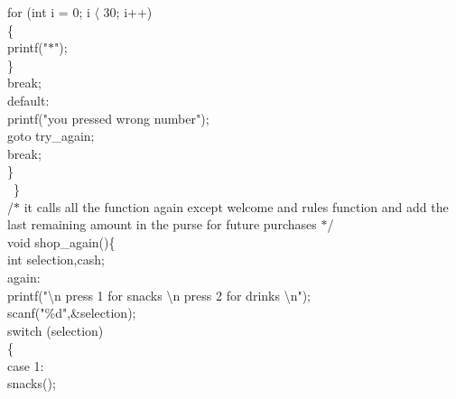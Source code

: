 \documentclass[10pt,a4paper]{article}
\begin{document}
\begin{flushleft}
    \hspace*{0.5cm}  for (int i = 0; i $\langle$ 30; i++)\\
    \hspace*{0.5cm}  \{\\
    \hspace*{0.5cm}  \hspace*{0.5cm}printf("$\ast$");\\
    \hspace*{0.5cm}  \}\\
    \hspace*{0.5cm}  break;\\
    \hspace*{0.5cm}  default:\\
    \hspace*{0.5cm}  \hspace*{0.5cm}printf("you pressed wrong number");\\
    \hspace*{0.5cm   \hspace*{0.5cm}}goto try\_again;\\
    \hspace*{0.5cm}  \hspace*{0.5cm}break;\\
    \hspace*{0.5cm}  \}\\\
\}\\
/$\ast$ it calls all the function again except welcome and rules function and add the last remaining amount in 
the purse for future purchases $\ast$/\\
void shop\_again()\{\\
    \hspace*{0.5cm}  int selection,cash;\\
    \hspace*{0.5cm}  again:\\
    \hspace*{0.5cm}  printf("\textbackslash n press 1 for snacks \textbackslash n press 2 for drinks \textbackslash n");\\
    \hspace*{0.5cm}  scanf("\%d",\&selection);\\
    \hspace*{0.5cm}  switch (selection)\\
    \hspace*{0.5cm}  \{\\
    \hspace*{0.5cm}  case 1:\\
    \hspace*{0.5cm}  \hspace*{0.5cm}    snacks();\\

\end{flushleft}
\end{document}
